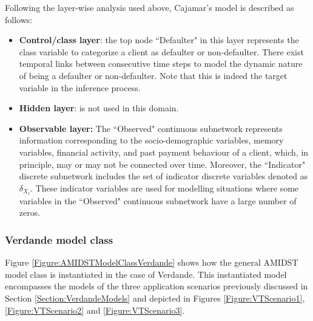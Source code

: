 Following the layer-wise analysis used above, Cajamar's model is described as follows:
\begin{itemize}

\item \textbf{Control/class layer}: the top node ``Defaulter" in this layer represents the class variable to categorize a client as defaulter or non-defaulter. There exist temporal links between consecutive time steps to model the dynamic nature of being a defaulter or non-defaulter. Note that this is indeed the target variable in the inference process.

\item \textbf{Hidden layer}: is not used in this domain.

\item \textbf{Observable layer:} The ``Observed" continuous subnetwork represents information corresponding to the socio-demographic variables, memory variables, financial activity, and past payment behaviour of a client, which, in principle, may or may not be connected over time. Moreover, the ``Indicator" discrete subnetwork includes the set of indicator discrete variables denoted as $\delta_{X_t}$. These indicator variables are used for modelling situations where some variables in the ``Observed" continuous subnetwork have a large number of zeros.

\end{itemize}


\subsubsection{Verdande model class}\label{verdandeAMIDSTModels}

Figure \ref{Figure:AMIDSTModelClassVerdande} shows how the general AMIDST model class is instantiated in the case of Verdande. This instantiated model encompasses the models of the three application scenarios previously discussed in Section \ref{Section:VerdandeModels} and depicted in Figures \ref{Figure:VTScenario1}, \ref{Figure:VTScenario2} and \ref{Figure:VTScenario3}.

